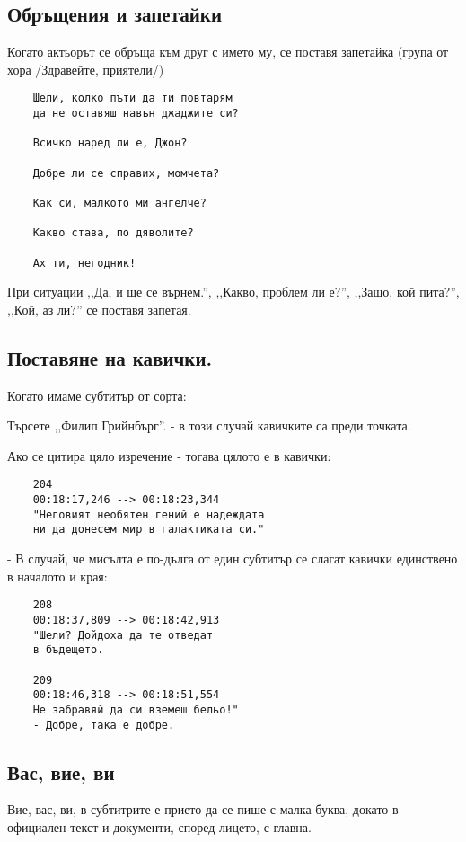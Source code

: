 \subsection{Обръщения и запетайки}

Когато актьорът се обръща към друг с името му, се поставя запетайка (група от хора /Здравейте, приятели/)

\begin{verbatim}
    Шели, колко пъти да ти повтарям
    да не оставяш навън джаджите си?

    Всичко наред ли е, Джон?

    Добре ли се справих, момчета?

    Как си, малкото ми ангелче?

    Какво става, по дяволите?

    Ах ти, негодник!
\end{verbatim}

При ситуации ,,Да, и ще се върнем.'', ,,Какво, проблем ли е?'', ,,Защо, кой пита?'', ,,Кой, аз ли?'' се поставя запетая.

\subsection{Поставяне на кавички.}
Когато имаме субтитър от сорта:

Търсете ,,Филип Грийнбърг''. - в този случай кавичките са преди точката.

Ако се цитира цяло изречение - тогава цялото е в кавички:

\begin{verbatim}
    204
    00:18:17,246 --> 00:18:23,344
    "Неговият необятен гений е надеждата
    ни да донесем мир в галактиката си."
\end{verbatim}


- В случай, че мисълта е по-дълга от един субтитър се слагат кавички единствено в началото и края:


\begin{verbatim}
    208
    00:18:37,809 --> 00:18:42,913
    "Шели? Дойдоха да те отведат
    в бъдещето.

    209
    00:18:46,318 --> 00:18:51,554
    Не забравяй да си вземеш бельо!"
    - Добре, така е добре.
\end{verbatim}


\subsection{Вас, вие, ви}
Вие, вас, ви, в субтитрите е прието да се пише с малка буква, докато в официален текст и документи, според лицето, с главна. 


